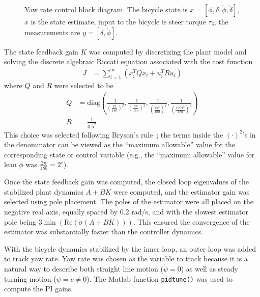 \begin{figure}[htbp]
  \caption{Yaw rate control block diagram. The bicycle state is $x=[\phi,
  \delta, \dot{\phi}, \dot{\delta}]$, $\hat{x}$ is the state estimate, input to
  the bicycle is steer torque $\tau_\delta$, the measurements are $y =
  [\delta, \dot{\phi}]$.}
  \label{rb:fig:yr_block_diagram}
\end{figure}
The state feedback gain $K$ was computed by discretizing the plant model and
solving the discrete algebraic Riccati equation associated with the cost
function
\begin{align}
  J &= \sum_{i=1}^{\infty} (x_i^T Q x_i + u_i^T R u_i)
\end{align}
where $Q$ and $R$ were selected to be
\begin{align}
  Q &= \text{diag}(\frac{1}{(\frac{2\pi}{180})^{2}},
                   \frac{1}{(\frac{5\pi}{180})^{2}},
                   \frac{1}{(\frac{2\pi^2}{180})^{2}},
                   \frac{1}{(\frac{100\pi^2}{180})^{2}}) \\
  R &= \frac{1}{0.5^2}
\end{align}
This choice was selected following Bryson's rule~\cite{Bryson1975}; the terms
inside the $(\cdot)^2$'s in the denominator can be viewed as the ``maximum
allowable'' value for the corresponding state or control variable (e.g., the
``maximum allowable'' value for lean $\phi$ was $\frac{2\pi}{180}=2^{\circ}$).

Once the state feedback gain was computed, the closed loop eigenvalues of the
stabilized plant dynamics $A+BK$ were computed, and the estimator gain was
selected using pole placement. The poles of the estimator were all placed on
the negative real axis, equally spaced by 0.2 rad/s, and with the slowest estimator
pole being $3\min(\text{Re}(\sigma(A+BK)))$. This ensured the convergence of
the estimator was substantially faster than the controller dynamics.

With the bicycle dynamics stabilized by the inner loop, an outer loop was added
to track yaw rate. Yaw rate was chosen as the variable to track because it is a
natural way to describe both straight line motion ($\dot{\psi}=0$) as well as
steady turning motion ($\dot{\psi}=c\ne0$). The Matlab function
\verb|pidtune()| was used to compute the PI gains.

